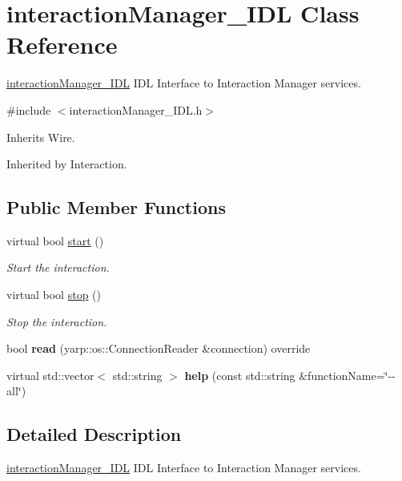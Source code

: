 \section{interaction\+Manager\+\_\+\+I\+DL Class Reference}
\label{classinteractionManager__IDL}


\hyperlink{classinteractionManager__IDL}{interaction\+Manager\+\_\+\+I\+DL} I\+DL Interface to Interaction Manager services.  




{\ttfamily \#include $<$interaction\+Manager\+\_\+\+I\+D\+L.\+h$>$}



Inherits Wire.



Inherited by Interaction.

\subsection*{Public Member Functions}
\begin{DoxyCompactItemize}
\item 
virtual bool \hyperlink{classinteractionManager__IDL_ad6c8ab9126614fd7e07968e4c430be25}{start} ()
\begin{DoxyCompactList}\small\item\em Start the interaction. \end{DoxyCompactList}\item 
virtual bool \hyperlink{classinteractionManager__IDL_a0a3e324a4ab82896e627e83803137595}{stop} ()
\begin{DoxyCompactList}\small\item\em Stop the interaction. \end{DoxyCompactList}\item 
\mbox{\label{classinteractionManager__IDL_ab3d4dbd821243f67cdbc2140f57932b5}} 
bool {\bfseries read} (yarp\+::os\+::\+Connection\+Reader \&connection) override
\item 
\mbox{\label{classinteractionManager__IDL_aae35412842de23ee93849813d7e4b2e7}} 
virtual std\+::vector$<$ std\+::string $>$ {\bfseries help} (const std\+::string \&function\+Name=\char`\"{}-\/-\/all\char`\"{})
\end{DoxyCompactItemize}


\subsection{Detailed Description}
\hyperlink{classinteractionManager__IDL}{interaction\+Manager\+\_\+\+I\+DL} I\+DL Interface to Interaction Manager services. 

